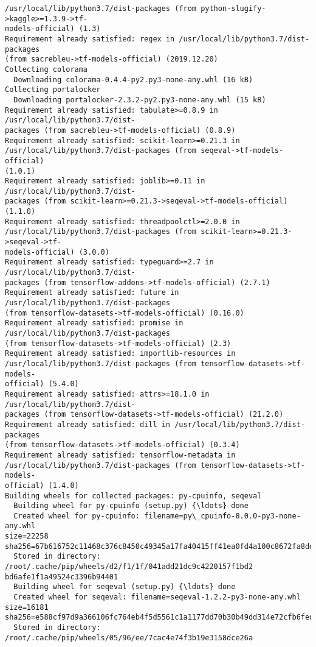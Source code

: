 \documentclass[11pt]{article}
\begin{document}
\begin{Verbatim}[commandchars=\\\{\}]
/usr/local/lib/python3.7/dist-packages (from python-slugify->kaggle>=1.3.9->tf-
models-official) (1.3)
Requirement already satisfied: regex in /usr/local/lib/python3.7/dist-packages
(from sacrebleu->tf-models-official) (2019.12.20)
Collecting colorama
  Downloading colorama-0.4.4-py2.py3-none-any.whl (16 kB)
Collecting portalocker
  Downloading portalocker-2.3.2-py2.py3-none-any.whl (15 kB)
Requirement already satisfied: tabulate>=0.8.9 in /usr/local/lib/python3.7/dist-
packages (from sacrebleu->tf-models-official) (0.8.9)
Requirement already satisfied: scikit-learn>=0.21.3 in
/usr/local/lib/python3.7/dist-packages (from seqeval->tf-models-official)
(1.0.1)
Requirement already satisfied: joblib>=0.11 in /usr/local/lib/python3.7/dist-
packages (from scikit-learn>=0.21.3->seqeval->tf-models-official) (1.1.0)
Requirement already satisfied: threadpoolctl>=2.0.0 in
/usr/local/lib/python3.7/dist-packages (from scikit-learn>=0.21.3->seqeval->tf-
models-official) (3.0.0)
Requirement already satisfied: typeguard>=2.7 in /usr/local/lib/python3.7/dist-
packages (from tensorflow-addons->tf-models-official) (2.7.1)
Requirement already satisfied: future in /usr/local/lib/python3.7/dist-packages
(from tensorflow-datasets->tf-models-official) (0.16.0)
Requirement already satisfied: promise in /usr/local/lib/python3.7/dist-packages
(from tensorflow-datasets->tf-models-official) (2.3)
Requirement already satisfied: importlib-resources in
/usr/local/lib/python3.7/dist-packages (from tensorflow-datasets->tf-models-
official) (5.4.0)
Requirement already satisfied: attrs>=18.1.0 in /usr/local/lib/python3.7/dist-
packages (from tensorflow-datasets->tf-models-official) (21.2.0)
Requirement already satisfied: dill in /usr/local/lib/python3.7/dist-packages
(from tensorflow-datasets->tf-models-official) (0.3.4)
Requirement already satisfied: tensorflow-metadata in
/usr/local/lib/python3.7/dist-packages (from tensorflow-datasets->tf-models-
official) (1.4.0)
Building wheels for collected packages: py-cpuinfo, seqeval
  Building wheel for py-cpuinfo (setup.py) {\ldots} done
  Created wheel for py-cpuinfo: filename=py\_cpuinfo-8.0.0-py3-none-any.whl
size=22258
sha256=67b616752c11468c376c8450c49345a17fa40415ff41ea0fd4a100c8672fa8dd
  Stored in directory: /root/.cache/pip/wheels/d2/f1/1f/041add21dc9c4220157f1bd2
bd6afe1f1a49524c3396b94401
  Building wheel for seqeval (setup.py) {\ldots} done
  Created wheel for seqeval: filename=seqeval-1.2.2-py3-none-any.whl size=16181
sha256=e588cf97d9a366106fc764eb4f5d5561c1a1177dd70b30b49dd314e72cfb6fed
  Stored in directory: /root/.cache/pip/wheels/05/96/ee/7cac4e74f3b19e3158dce26a

\end{Verbatim}
\end{document}
